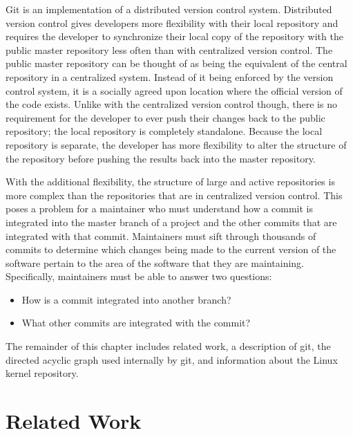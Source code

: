 Git is an implementation of a distributed version control system.
Distributed version control gives developers more flexibility with their
local repository and requires the developer to synchronize their local
copy of the repository with the public master repository less often
than with centralized version control.
The public master repository can be thought of as being the equivalent
of the central repository in a centralized system.
Instead of it being enforced by the version control system,
it is a socially agreed upon location where the official version of the
code exists.
Unlike with the centralized version control though,
there is no requirement for the developer to ever push their changes
back to the public repository;
the local repository is completely standalone.
Because the local repository is separate, the developer has more
flexibility to alter the structure of the repository before pushing
the results back into the master repository.

With the additional flexibility, the structure of large and active
repositories is more complex than the repositories that are in
centralized version control. This poses a problem for a maintainer who
must understand how a commit is integrated into the master branch of a
project and the other commits that are integrated with that commit.
Maintainers must sift through thousands of commits to determine which
changes being made to the current version of the software pertain to
the area of the software that they are maintaining.
Specifically, maintainers must be able to answer two questions:

\begin{textbox}
\begin{itemize}
  \item How is a commit integrated into another branch?
  \item What other commits are integrated with the commit?
\end{itemize}
\end{textbox}

The remainder of this chapter includes related work, a description of
git, the directed acyclic graph used internally by git, and information
about the Linux kernel repository.

\section{Related Work}\label{sec:related_work}

